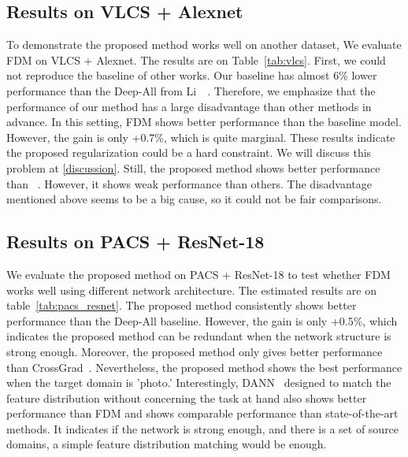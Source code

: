 \subsection{Results on VLCS + Alexnet}
To demonstrate the proposed method works well on another dataset, We evaluate FDM on VLCS + Alexnet. The results are on Table~\ref{tab:vlcs}. First, we could not reproduce the baseline of other works. Our baseline has almost 6\% lower performance than the Deep-All from Li~\etal~\cite{li2019episodic}. Therefore, we emphasize that the performance of our method has a large disadvantage than other methods in advance.  In this setting, FDM shows better performance than the baseline model. However, the gain is only +0.7\%, which is quite marginal. These results indicate the proposed regularization could be a hard constraint. We will discuss this problem at \ref{discussion}. Still, the proposed method shows better performance than ~\cite{lresvm, muandet2013domaingeneralization}. However, it shows weak performance than others. The disadvantage mentioned above seems to be a big cause, so it could not be fair comparisons.

\subsection{Results on PACS + ResNet-18}
We evaluate the proposed method on PACS + ResNet-18 to test whether FDM works well using different network architecture. The estimated results are on table~\ref{tab:pacs_resnet}. The proposed method consistently shows better performance than the Deep-All baseline. However, the gain is only +0.5\%, which indicates the proposed method can be redundant when the network structure is strong enough. Moreover, the proposed method only gives better performance than CrossGrad~\cite{shankar2018generalizing}. Nevertheless, the proposed method shows the best performance when the target domain is 'photo.' Interestingly, DANN~\cite{ganin2016dann} designed to match the feature distribution without concerning the task at hand also shows better performance than FDM and shows comparable performance than state-of-the-art methods. It indicates if the network is strong enough, and there is a set of source domains, a simple feature distribution matching would be enough. 


